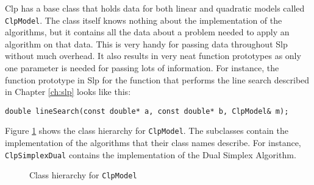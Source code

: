 Clp has a base class that holds data for both linear and quadratic models
called \texttt{ClpModel}.
The class itself knows nothing about the implementation of the algorithms, but
it contains all the data about a problem needed to apply an algorithm on that
data.
This is very handy for passing data throughout Slp without much overhead.
It also results in very neat function prototypes as only one parameter
is needed for passing lots of information. For instance, the function prototype
in Slp for the function that performs the line search described in Chapter
\ref{ch:slp} looks like this:
\begin{verbatim}
double lineSearch(const double* a, const double* b, ClpModel& m);
\end{verbatim}
Figure \ref{fig:clpmodel} shows the class hierarchy for \texttt{ClpModel}.
The subclasses contain the implementation of the algorithms that their class
names describe. For instance, \texttt{ClpSimplexDual} contains the
implementation of the Dual Simplex Algorithm.
\begin{figure}
\centering
{}
\caption{Class hierarchy for \texttt{ClpModel}}
\label{fig:clpmodel}
\end{figure}
